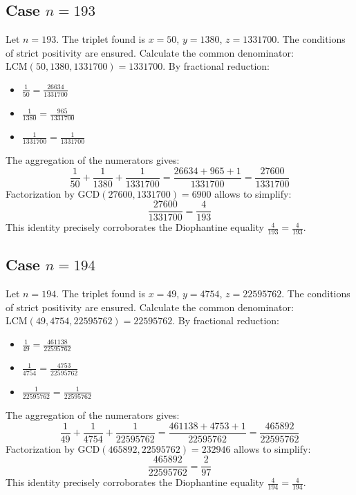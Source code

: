 \documentclass[11pt,a4paper]{article}
\begin{document}
\subsection{Case $n = 193$}
Let $n = 193$. The triplet found is $x = 50$, $y = 1380$, $z = 1331700$.
The conditions of strict positivity are ensured.
Calculate the common denominator: $\text{LCM}(50, 1380, 1331700) = 1331700$.
By fractional reduction:
\begin{itemize}
    \item $\frac{1}{50} = \frac{26634}{1331700}$
    \item $\frac{1}{1380} = \frac{965}{1331700}$
    \item $\frac{1}{1331700} = \frac{1}{1331700}$
\end{itemize}
The aggregation of the numerators gives:
$$ \frac{1}{50} + \frac{1}{1380} + \frac{1}{1331700} = \frac{26634 + 965 + 1}{1331700} = \frac{27600}{1331700} $$
Factorization by $\text{GCD}(27600, 1331700) = 6900$ allows to simplify:
$$ \frac{27600}{1331700} = \frac{4}{193} $$
This identity precisely corroborates the Diophantine equality $\frac{4}{193} = \frac{4}{193}$.

\subsection{Case $n = 194$}
Let $n = 194$. The triplet found is $x = 49$, $y = 4754$, $z = 22595762$.
The conditions of strict positivity are ensured.
Calculate the common denominator: $\text{LCM}(49, 4754, 22595762) = 22595762$.
By fractional reduction:
\begin{itemize}
    \item $\frac{1}{49} = \frac{461138}{22595762}$
    \item $\frac{1}{4754} = \frac{4753}{22595762}$
    \item $\frac{1}{22595762} = \frac{1}{22595762}$
\end{itemize}
The aggregation of the numerators gives:
$$ \frac{1}{49} + \frac{1}{4754} + \frac{1}{22595762} = \frac{461138 + 4753 + 1}{22595762} = \frac{465892}{22595762} $$
Factorization by $\text{GCD}(465892, 22595762) = 232946$ allows to simplify:
$$ \frac{465892}{22595762} = \frac{2}{97} $$
This identity precisely corroborates the Diophantine equality $\frac{4}{194} = \frac{4}{194}$.
\end{document}
